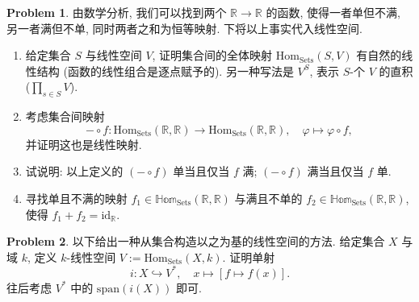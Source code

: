 \documentclass{MainStyle}
\theoremstyle{definition}
\newtheorem{problem}{Problem}
\begin{document}
\begin{problem}
由数学分析, 我们可以找到两个 $\mathbb R\to \mathbb R$ 的函数, 使得一者单但不满, 另一者满但不单, 同时两者之和为恒等映射. 下将以上事实代入线性空间.
\begin{enumerate}
    \item 给定集合 $S$ 与线性空间 $V$, 证明集合间的全体映射 $\mathrm{Hom}_{\mathrm{Sets}}(S,V)$ 有自然的线性结构 (函数的线性组合是逐点赋予的). 另一种写法是 $V^S$, 表示 $S$-个 $V$ 的直积 ($\prod_{s\in S}V$).
    \item 考虑集合间映射
          \begin{equation}
              -\circ f:\mathrm{Hom}_{\mathrm{Sets}}(\mathbb R,\mathbb R)\to \mathrm{Hom}_{\mathrm{Sets}}(\mathbb R,\mathbb R),\quad \varphi \mapsto \varphi\circ f,
          \end{equation}
          并证明这也是线性映射.
    \item 试说明: 以上定义的 $(-\circ f)$ 单当且仅当 $f$ 满; $(-\circ f)$ 满当且仅当 $f$ 单.
    \item 寻找单且不满的映射 $f_1\in \mathbb {Hom}_{\mathrm{Sets}}(\mathbb R,\mathbb R)$ 与满且不单的 $f_2\in \mathbb {Hom}_{\mathrm{Sets}}(\mathbb R,\mathbb R)$, 使得 $f_1+f_2=\mathrm{id}_{\mathbb R}$.
\end{enumerate}
\end{problem}

\begin{problem}
以下给出一种从集合构造以之为基的线性空间的方法. 给定集合 $X$ 与域 $k$, 定义 $k$-线性空间 $V:=\mathrm{Hom}_{\mathrm{Sets}}(X,k)$. 证明单射
\begin{equation}
    i:X\hookrightarrow V^\ast ,\quad x\mapsto [f\mapsto f(x)].
\end{equation}
往后考虑 $V^\ast$ 中的 $\mathrm{span}(i(X))$ 即可.
\end{problem}
\end{document}
